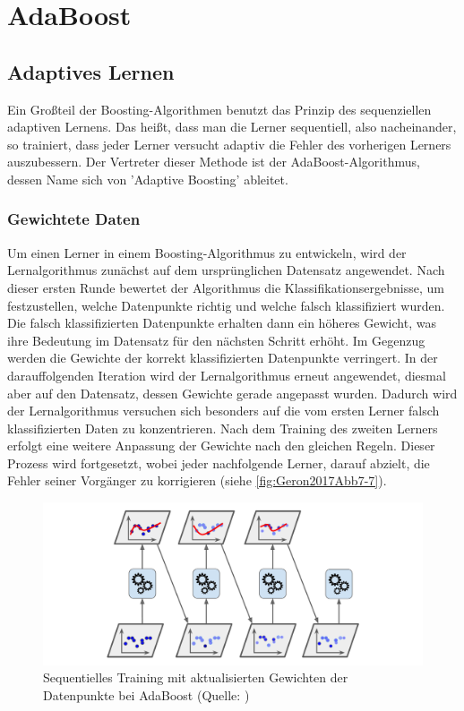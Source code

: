 \section{AdaBoost}
\subsection{Adaptives Lernen}
Ein Großteil der Boosting-Algorithmen benutzt das Prinzip des sequenziellen adaptiven Lernens. Das heißt, dass man die Lerner sequentiell, also nacheinander, so trainiert, dass jeder Lerner versucht adaptiv die Fehler des vorherigen Lerners auszubessern.
\newline
Der Vertreter dieser Methode ist der AdaBoost-Algorithmus, dessen Name sich von 'Adaptive Boosting' ableitet.
\subsubsection{Gewichtete Daten}
Um einen Lerner in einem Boosting-Algorithmus zu entwickeln, wird der Lernalgorithmus zunächst auf dem ursprünglichen Datensatz angewendet. Nach dieser ersten Runde bewertet der Algorithmus die Klassifikationsergebnisse, um festzustellen, welche Datenpunkte richtig und welche falsch klassifiziert wurden. Die falsch klassifizierten Datenpunkte erhalten dann ein höheres Gewicht, was ihre Bedeutung im Datensatz für den nächsten Schritt erhöht. Im Gegenzug werden die Gewichte der korrekt klassifizierten Datenpunkte verringert.
\newline
In der darauffolgenden Iteration wird der Lernalgorithmus erneut angewendet, diesmal aber auf den Datensatz, dessen Gewichte gerade angepasst wurden. Dadurch wird der Lernalgorithmus versuchen sich besonders auf die vom ersten Lerner falsch klassifizierten Daten zu konzentrieren. Nach dem Training des zweiten Lerners erfolgt eine weitere Anpassung der Gewichte nach den gleichen Regeln.
\newline
Dieser Prozess wird fortgesetzt, wobei jeder nachfolgende Lerner, darauf abzielt, die Fehler seiner Vorgänger zu korrigieren (siehe \autoref{fig:Geron2017Abb7-7}).

\begin{figure}[h]
    \centering
    \includegraphics[width=\linewidth]{Images/Geron2017Abb7-7.png}
    \caption[Sequentielles Training mit aktualisierten Gewichten der Datenpunkte bei AdaBoost]{Sequentielles Training mit aktualisierten Gewichten der Datenpunkte bei AdaBoost (Quelle: \textcite[Abbildung 7-7][S.~192]{Geron2018})}
    \label{fig:Geron2017Abb7-7}
\end{figure}

